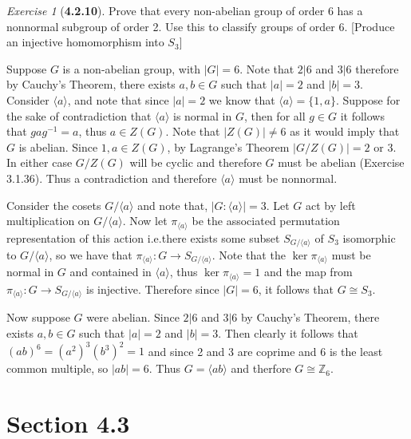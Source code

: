 \documentclass[12pt]{amsart}
\makeatletter
\theoremstyle{remark}
\newtheorem*{exercise}{Exercise}%
\def\ZZ{\ensuremath{\mathbb Z}}
\renewenvironment{proof}[1][\proofname]{\par\doublespacing
  \pushQED{\qed}%
  \normalfont \topsep6\p@\@plus6\p@\relax
  \list{}{%
    \settowidth{\leftmargin}{\itshape\proofname:\hskip\labelsep}%
    \setlength{\labelwidth}{0pt}%
    \setlength{\itemindent}{-\leftmargin}%
  }%
  \item[\hskip\labelsep\itshape#1\@addpunct{:}]\ignorespaces
}{%
  \popQED\endlist\@endpefalse
  \singlespacing
}
\theoremstyle{mycomment}
\makeatother
\begin{document}
\begin{exercise}[\textbf{4.2.10}] Prove that every non-abelian group of order 6 has a nonnormal subgroup of order 2. Use this to classify groups of order 6. [Produce an injective homomorphism into $S_3$]
  \begin{proof} Suppose $G$ is a non-abelian group, with $|G| = 6$. Note that $2|6$ and $3|6$ therefore by Cauchy's Theorem, there exists $a, b \in G$ such that $|a| = 2$ and $|b| = 3$. Consider $\langle a \rangle$, and note that since $|a| = 2$ we know that $\langle a \rangle = \{1, a\}$. Suppose for the sake of contradiction that $\langle a \rangle$ is normal in $G$, then for all $g \in G$ it follows that $gag^{-1} = a$, thus $a \in Z(G)$. Note that $|Z(G)| \neq 6$ as it would imply that $G$ is abelian. Since $1, a \in Z(G)$, by Lagrange's Theorem $|G/Z(G)| = 2 \text { or } 3$. In either case $G/Z(G)$ will be cyclic and therefore $G$ must be abelian (Exercise 3.1.36). Thus a contradiction and therefore $\langle a \rangle$ must be nonnormal.


  Consider the cosets $G/\langle a \rangle$ and note that, $|G:\langle a \rangle| = 3$. Let $G$ act by left multiplication on $G/\langle a \rangle$. Now let $\pi_{\langle a \rangle}$ be the associated permutation representation of this action i.e.there exists some subset $S_{G/ \langle a \rangle }$ of $S_3$ isomorphic to $G/ \langle a \rangle $, so we have that $\pi_{ \langle a \rangle }: G \to S_{G/ \langle a \rangle }$. Note that the $\ker \pi_{ \langle a \rangle }$ must be normal in $G$ and contained in $\langle a\rangle$, thus $\ker \pi_{ \langle a \rangle } = 1$ and the map from  $\pi_{ \langle a \rangle }: G \to S_{G/ \langle a \rangle }$ is injective. Therefore since $|G| = 6$, it follows that $G \cong S_3$.
  
  Now suppose $G$ were abelian. Since $2|6$ and $3|6$ by Cauchy's Theorem, there exists $a, b \in G$ such that $| a | = 2$ and $| b | = 3$. Then clearly it follows that $(ab)^6 = (a^2)^3(b^3)^2 = 1$ and since 2 and 3 are coprime and 6 is the least common multiple, so $|ab| = 6$. Thus $G = \langle ab\rangle$ and therfore $G \cong \ZZ_6$. 
  \end{proof}
\end{exercise}
\vspace{.15in}

\section*{\textbf{Section 4.3}}
\end{document}
